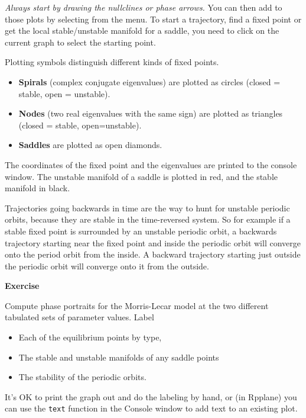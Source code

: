 \documentclass [11pt]{article}
\newcommand{\ttt}[1]{\texttt{#1}}
\newcounter{exercise}
\numberwithin{exercise}{section}
\newcommand{\exnumber}{\addtocounter{exercise}{1} \theexercise \thinspace}
\begin{document}
\textit{Always start by drawing the nullclines or phase arrows.} You can then 
add to those plots by selecting from the menu. To start a trajectory, find a fixed
point or get the local stable/unstable manifold for a saddle, you need to 
click on the current graph to select the starting point. 

Plotting symbols distinguish different kinds of fixed points. 
\begin{itemize}
\item \textbf{Spirals} (complex conjugate eigenvalues) are plotted as circles (closed = stable, open = unstable).
\item \textbf{Nodes} (two real eigenvalues with the same sign) are plotted as triangles (closed = stable, open=unstable). 
\item \textbf{Saddles} are plotted as open diamonds.  
\end{itemize} 
The coordinates of the fixed point and the eigenvalues are printed to the console window. 
The unstable manifold of a saddle is plotted in red, and the stable manifold in black.  

Trajectories going backwards in time are the way to hunt for unstable periodic orbits,
because they are stable in the time-reversed system. So for example if a stable fixed point
is surrounded by an unstable periodic orbit, a backwards trajectory starting near the fixed
point and inside the periodic orbit will converge onto the period orbit from the inside. A backward
trajectory starting just outside the periodic orbit will converge onto it from the outside. 

{\bf Exercise \exnumber} Compute phase portraits for the Morris-Lecar model at the two different
tabulated sets of parameter values. Label
\begin{itemize} 
\item Each of the equilibrium points by type, 
\item The stable and unstable manifolds of any saddle points 
\item The stability of the periodic orbits. 
\end{itemize}
It's OK to  print the graph out and do the labeling by hand, or (in Rpplane) you can use the 
\ttt{text} function in the Console window to add text to an existing plot. 
\end{document}
